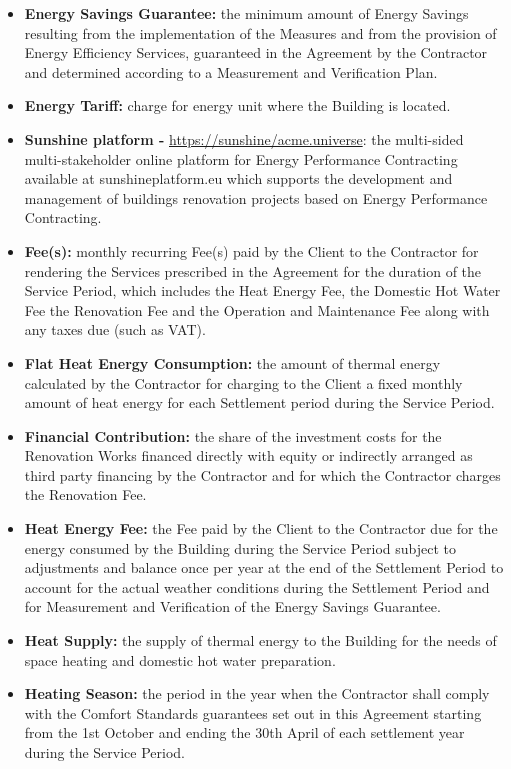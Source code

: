 \begin{multicols}{2}
\begin{itemize}[label={}]
	\item\textbf{Energy Savings Guarantee:} the minimum amount of Energy Savings resulting from the implementation of the Measures and from the provision of Energy Efficiency Services, guaranteed in the Agreement by the Contractor and determined according to a Measurement and Verification Plan.
	\item\textbf{Energy Tariff:} charge for energy unit where the Building is located.
	\item\textbf{Sunshine platform - } \url{https://sunshine/acme.universe}: the multi-sided multi-stakeholder online platform for Energy Performance Contracting available at sunshineplatform.eu which supports the development and management of buildings renovation projects based on Energy Performance Contracting.
	\item\textbf{Fee(s):} monthly recurring Fee(s) paid by the Client to the Contractor for rendering the Services prescribed in the Agreement for the duration of the Service Period, which includes the Heat Energy Fee, the Domestic Hot Water Fee the Renovation Fee and the Operation and Maintenance Fee along with any taxes due (such as VAT).
	\item\textbf{Flat Heat Energy Consumption:}  the amount of thermal energy calculated by the Contractor for charging to the Client a fixed monthly amount of heat energy for each Settlement period during the Service Period.
	\item\textbf{Financial Contribution:} the share of the investment costs for the Renovation Works financed directly with equity or indirectly arranged as third party financing by the Contractor and for which the Contractor charges the Renovation Fee.
	\item\textbf{Heat Energy Fee:} the Fee paid by the Client to the Contractor due for the energy consumed by the Building during the Service Period subject to adjustments and balance once per year at the end of the Settlement Period to account for the actual weather conditions during the Settlement Period and for Measurement and Verification of the Energy Savings Guarantee.
	\item\textbf{Heat Supply:} the supply of thermal energy to the Building for the needs of space heating and domestic hot water preparation.
	\item\textbf{Heating Season:} the period in the year when the Contractor shall comply with the Comfort Standards guarantees set out in this Agreement starting from the 1st October and ending the 30th April of each settlement year during the Service Period.

\end{itemize}
\end{multicols}
